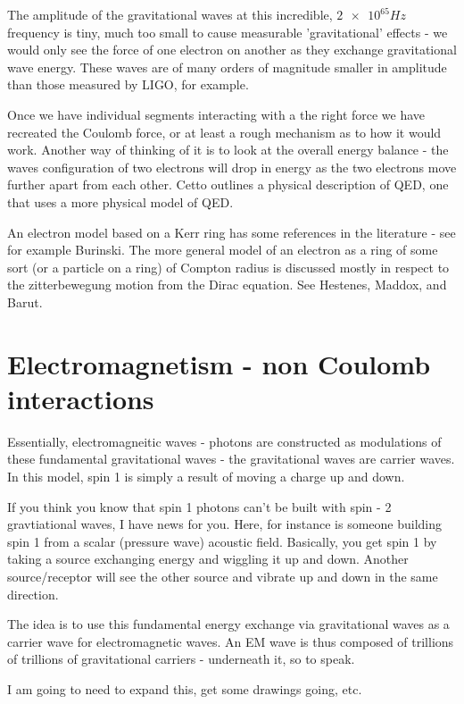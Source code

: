 \documentclass[../rzero]{subfiles}
\begin{document}
 The amplitude of the gravitational waves at this incredible, $\num{2e65} Hz$ frequency is tiny, much too small to cause measurable 'gravitational' effects - we would only see the force of one electron on another as they exchange gravitational wave energy. These waves are of many orders of magnitude smaller in amplitude than those measured by LIGO, for example.
 
 Once we have individual segments interacting with a the right force we have recreated the Coulomb force, or at least a rough mechanism as to how it would work. Another way of thinking of it is to look at the overall energy balance - the waves configuration of two electrons will drop in energy as the two electrons move further apart from each other. Cetto\cite{Cetto2013} outlines a physical description of QED, one that uses a more physical model of QED. 
  
 An electron model based on a Kerr ring has some references in the literature - see for example Burinski\cite{Burinskii2012}. The more general model of an electron as a ring of some sort (or a particle on a ring) of Compton radius is discussed mostly in respect to the zitterbewegung motion from the Dirac equation. See Hestenes\cite{Hestenes1990}, Maddox\cite{Maddox1987}, and Barut\cite{Barut1984}.
 
 \section{Electromagnetism - non Coulomb interactions} 
 Essentially, electromagneitic waves - photons are constructed as modulations of these fundamental gravitational waves - the gravitational waves are carrier waves. In this model, spin 1 is simply a result of moving a charge up and down. 
 
 If you think you know that spin 1 photons can't be built with spin - 2 gravtiational waves, I have news for you. Here, for instance is someone\cite{shiObservationAcousticSpin2019} building spin 1 from a scalar (pressure wave) acoustic field. Basically, you get spin 1 by taking a source exchanging energy and wiggling it up and down. Another source/receptor will see the other source and vibrate up and down in the same direction. 
 
 The idea is to use this fundamental energy exchange via gravitational waves as a carrier wave for electromagnetic waves. An EM wave is thus composed of trillions of trillions of gravitational carriers - underneath it, so to speak. 
 
 I am going to need to expand this, get some drawings going, etc. 
  
\end{document}
